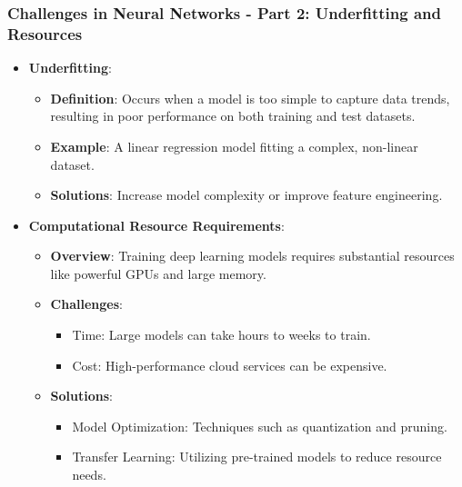 \documentclass[aspectratio=169]{beamer}
\begin{document}
\begin{frame}[fragile]
  \frametitle{Challenges in Neural Networks - Part 2: Underfitting and Resources}

  \begin{itemize}
    \item \textbf{Underfitting}:
      \begin{itemize}
        \item \textbf{Definition}: Occurs when a model is too simple to capture data trends, resulting in poor performance on both training and test datasets.
        \item \textbf{Example}: A linear regression model fitting a complex, non-linear dataset.
        \item \textbf{Solutions}: Increase model complexity or improve feature engineering.
      \end{itemize}
    
    \item \textbf{Computational Resource Requirements}:
      \begin{itemize}
        \item \textbf{Overview}: Training deep learning models requires substantial resources like powerful GPUs and large memory.
        \item \textbf{Challenges}:
          \begin{itemize}
            \item Time: Large models can take hours to weeks to train.
            \item Cost: High-performance cloud services can be expensive.
          \end{itemize}
        \item \textbf{Solutions}:
          \begin{itemize}
            \item Model Optimization: Techniques such as quantization and pruning.
            \item Transfer Learning: Utilizing pre-trained models to reduce resource needs.
          \end{itemize}
      \end{itemize}
  \end{itemize}
\end{frame}
\end{document}
